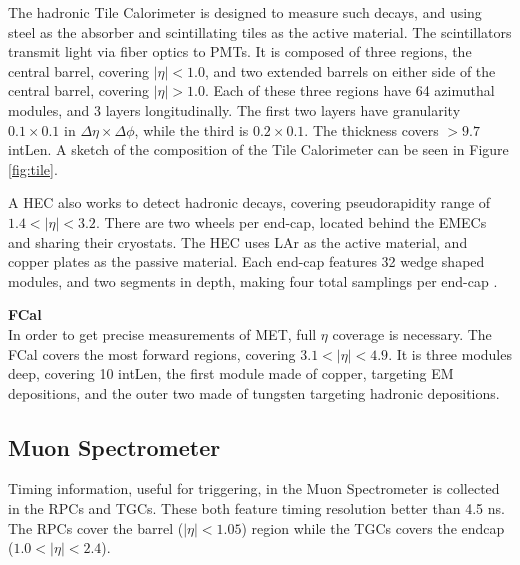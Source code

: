 \indent The hadronic Tile Calorimeter is designed to measure such decays, and using steel as the absorber and scintillating tiles as the active material. The scintillators transmit light via fiber optics to \glspl{PMT}. It is composed of three regions, the central barrel, covering $|\eta| < 1.0$, and two extended barrels on either side of the central barrel, covering $|\eta| > 1.0$. Each of these three regions have 64 azimuthal modules, and 3 layers longitudinally. The first two layers have granularity $0.1 \times 0.1$ in $\Delta\eta \times \Delta \phi$, while the third is $0.2 \times 0.1$. The thickness covers $>9.7$ \gls{intLen}. A sketch of the composition of the Tile Calorimeter can be seen in Figure \ref{fig:tile}.

A \gls{HEC} also works to detect hadronic decays, covering pseudorapidity range of $1.4 < |\eta| < 3.2$. There are two wheels per end-cap, located behind the \glspl{EMEC} and sharing their cryostats. The \gls{HEC} uses \gls{LAr} as the active material, and copper plates as the passive material. Each end-cap features 32 wedge shaped modules, and two segments in depth, making four total samplings per end-cap \cite{lar-tdr}.


\noindent\textbf{\gls{FCal}}\\
\indent In order to get precise measurements of \gls{MET}, full $\eta$ coverage is necessary. The \gls{FCal} covers the most forward regions, covering $3.1 < |\eta| < 4.9$. It is three modules deep, covering 10 \gls{intLen}, the first module made of copper, targeting \gls{EM} depositions, and the outer two made of tungsten targeting hadronic depositions.


\subsection{Muon Spectrometer} \label{ssec:muonspectrometer}

Timing information, useful for triggering, in the Muon Spectrometer is collected in the \glspl{RPC} and \glspl{TGC}. These both feature timing resolution better than 4.5 ns. The \glspl{RPC} cover the barrel ($|\eta| < 1.05$) region while the \glspl{TGC} covers the endcap ($1.0<|\eta|<2.4$).

